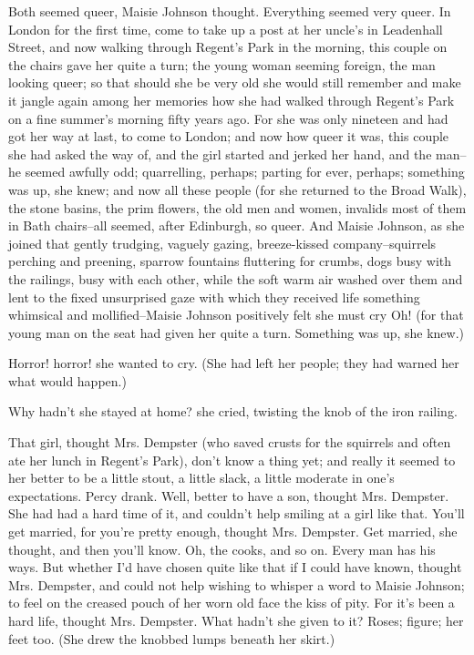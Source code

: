 \documentclass[lang=cn,10pt]{elegantbook}
\begin{document}
Both seemed queer, Maisie Johnson thought.  Everything seemed very
queer.  In London for the first time, come to take up a post at her
uncle's in Leadenhall Street, and now walking through Regent's Park
in the morning, this couple on the chairs gave her quite a turn;
the young woman seeming foreign, the man looking queer; so that
should she be very old she would still remember and make it jangle
again among her memories how she had walked through Regent's Park
on a fine summer's morning fifty years ago.  For she was only
nineteen and had got her way at last, to come to London; and now
how queer it was, this couple she had asked the way of, and the
girl started and jerked her hand, and the man--he seemed awfully
odd; quarrelling, perhaps; parting for ever, perhaps; something was
up, she knew; and now all these people (for she returned to the
Broad Walk), the stone basins, the prim flowers, the old men and
women, invalids most of them in Bath chairs--all seemed, after
Edinburgh, so queer.  And Maisie Johnson, as she joined that gently
trudging, vaguely gazing, breeze-kissed company--squirrels perching
and preening, sparrow fountains fluttering for crumbs, dogs busy
with the railings, busy with each other, while the soft warm air
washed over them and lent to the fixed unsurprised gaze with which
they received life something whimsical and mollified--Maisie
Johnson positively felt she must cry Oh! (for that young man on the
seat had given her quite a turn.  Something was up, she knew.)

Horror!  horror!  she wanted to cry.  (She had left her people;
they had warned her what would happen.)

Why hadn't she stayed at home? she cried, twisting the knob of the
iron railing.

That girl, thought Mrs. Dempster (who saved crusts for the
squirrels and often ate her lunch in Regent's Park), don't know a
thing yet; and really it seemed to her better to be a little stout,
a little slack, a little moderate in one's expectations.  Percy
drank.  Well, better to have a son, thought Mrs. Dempster.  She had
had a hard time of it, and couldn't help smiling at a girl like
that.  You'll get married, for you're pretty enough, thought Mrs.
Dempster.  Get married, she thought, and then you'll know.  Oh, the
cooks, and so on.  Every man has his ways.  But whether I'd have
chosen quite like that if I could have known, thought Mrs.
Dempster, and could not help wishing to whisper a word to Maisie
Johnson; to feel on the creased pouch of her worn old face the kiss
of pity.  For it's been a hard life, thought Mrs. Dempster.  What
hadn't she given to it?  Roses; figure; her feet too.  (She drew
the knobbed lumps beneath her skirt.)
\end{document}
